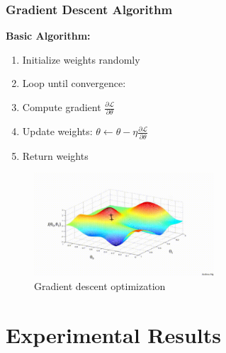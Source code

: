 \documentclass[notes]{beamer}
\begin{document}
\begin{frame}
\frametitle{Gradient Descent Algorithm}

\textbf{Basic Algorithm:}
\begin{enumerate}
\item Initialize weights randomly
\item Loop until convergence:
\item \quad Compute gradient $\frac{\partial \mathcal{L}}{\partial \theta}$
\item \quad Update weights: $\theta \leftarrow \theta - \eta \frac{\partial \mathcal{L}}{\partial \theta}$
\item Return weights
\end{enumerate}


\begin{figure}[ht]
	\centering
	\includegraphics[width=0.6\textwidth]{figs/sgd.gif}
	\caption*{Gradient descent optimization}
\end{figure}

\end{frame}

\section{Experimental Results}
\end{document}
